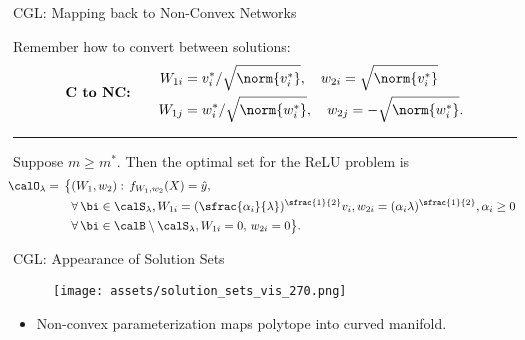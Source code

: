 \documentclass[usenames,dvipsnames,mathserif,notheorems]{beamer}
\newcommand{\horizontalrule}{
	{
			\vspace{-0.5em}
			\center \rule{\textwidth}{0.1em}
			\vspace{-0.2em}
		}
}
\begin{document}
\begin{frame}{CGL: Mapping back to Non-Convex Networks}

	Remember how to convert between solutions:
	\begin{equation*}
		\textbf{C to NC:} \quad \quad
		\begin{aligned}
			W_{1i} & = v_i^*/ \sqrt{\norm{v_i^*}}, \quad w_{2i} = \sqrt{\norm{v_i^*}}
			\\
			W_{1j} & = w_i^*/ \sqrt{\norm{w_i^*}}, \quad w_{2j} = -\sqrt{\norm{w_i^*}}.
		\end{aligned}
	\end{equation*}

	\pause
	\horizontalrule

	\begin{corollary}[Informal]
		Suppose \( m \geq m^* \).
		Then the optimal set for the ReLU problem is
		\vspace{-1ex}
		\begin{equation*}
			\begin{aligned}
				\hspace{-0.5em} \calO_\lambda  = \,
				\big\{
				 & (W_1,  w_2) :
				\, f_{W_1, w_2}(X)  =  \hat y,                        \\
				 & \forall \, \bi  \in  \calS_\lambda,
				W_{1i} = (\sfrac{\alpha_{i}}{\lambda})^{\sfrac{1}{2}} v_i,
				w_{2i} = (\alpha_i \lambda)^{\sfrac{1}{2}},
				\alpha_i \geq 0                                       \\
				 & \forall \, \bi  \in \calB \setminus \calS_\lambda,
				W_{1i} = 0, \, w_{2i} = 0
				\big\}.
			\end{aligned}
		\end{equation*}
	\end{corollary}

\end{frame}

\begin{frame}{CGL: Appearance of Solution Sets}
	\begin{figure}[]
		\centering
		\texttt{[image: assets/solution\_sets\_vis\_270.png]}
	\end{figure}

	\begin{itemize}
		\item Non-convex parameterization maps polytope into curved
		      manifold.
	\end{itemize}


\end{frame}
\end{document}
